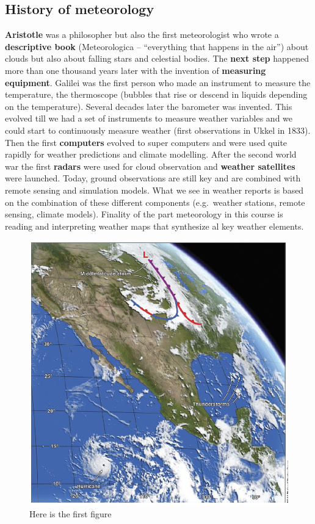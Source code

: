 \documentclass[oneside]{book}
\begin{document}
\subsection{History of meteorology}\label{history-of-meteorology}

\textbf{Aristotle} was a philosopher but also the first meteorologist
who wrote a \textbf{descriptive book} (Meteorologica -- ``everything
that happens in the air'') about clouds but also about falling stars and
celestial bodies. The \textbf{next step} happened more than one thousand
years later with the invention of \textbf{measuring equipment}. Galilei
was the first person who made an instrument to measure the temperature,
the thermoscope (bubbles that rise or descend in liquids depending on
the temperature). Several decades later the barometer was invented. This
evolved till we had a set of instruments to measure weather variables
and we could start to continuously measure weather (first observations
in Ukkel in 1833). Then the first \textbf{computers} evolved to super
computers and were used quite rapidly for weather predictions and
climate modelling. After the second world war the first \textbf{radars}
were used for cloud observation and \textbf{weather satellites} were
launched. Today, ground observations are still key and are combined with
remote sensing and simulation models. What we see in weather reports is
based on the combination of these different components (e.g.~weather
stations, remote sensing, climate models). Finality of the part
meteorology in this course is reading and interpreting weather maps that
synthesize al key weather elements.

\begin{figure}

{\centering \includegraphics[width=0.5\linewidth]{figures/Figure17} 

}

\caption{Here is the first figure}\label{fig:History1}
\end{figure}
\end{document}
